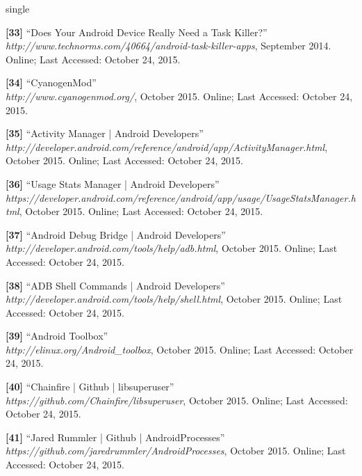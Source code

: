 \documentclass[12pt]{uthesis-v12}  %
\begin{document}
\begin{referencelist}{single}
	\item \textbf{[33]} ``Does Your Android Device Really Need a Task Killer?''
	\\\emph{http://www.technorms.com/40664/android-task-killer-apps}, September 2014. 
	Online; Last Accessed: October 24, 2015.
											
	\item \textbf{[34]} ``CyanogenMod''
	\\\emph{http://www.cyanogenmod.org/}, October 2015. 
	Online; Last Accessed: October 24, 2015.
											
	\item \textbf{[35]} ``Activity Manager | Android Developers''
	\\\emph{http://developer.android.com/reference/android/app/ActivityManager.html}, October 2015. 
	Online; Last Accessed: October 24, 2015.
	
	\item \textbf{[36]} ``Usage Stats Manager | Android Developers''
	\\\emph{https://developer.android.com/reference/android/app/usage/UsageStatsManager.html}, October 2015. 
	Online; Last Accessed: October 24, 2015.																			

	\item \textbf{[37]} ``Android Debug Bridge | Android Developers''
	\\\emph{http://developer.android.com/tools/help/adb.html}, October 2015. 
	Online; Last Accessed: October 24, 2015.

	\item \textbf{[38]} ``ADB Shell Commands | Android Developers''
	\\\emph{http://developer.android.com/tools/help/shell.html}, October 2015. 
	Online; Last Accessed: October 24, 2015.
	
	\item \textbf{[39]} ``Android Toolbox''
	\\\emph{http://elinux.org/Android\_toolbox}, October 2015. 
	Online; Last Accessed: October 24, 2015.
	
	\item \textbf{[40]} ``Chainfire | Github | libsuperuser''
	\\\emph{https://github.com/Chainfire/libsuperuser}, October 2015. 
	Online; Last Accessed: October 24, 2015.
	
	\item \textbf{[41]} ``Jared Rummler | Github | AndroidProcesses''
	\\\emph{https://github.com/jaredrummler/AndroidProcesses}, October 2015. 
	Online; Last Accessed: October 24, 2015.


\end{referencelist}
\end{document}
